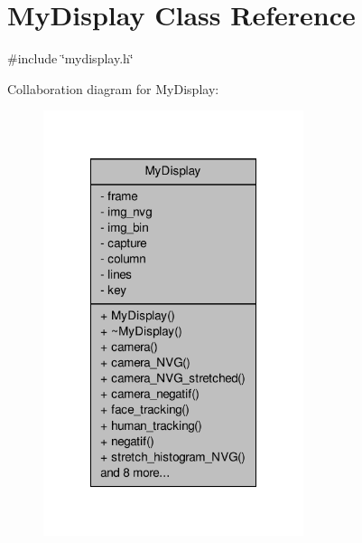 \hypertarget{classMyDisplay}{\section{My\-Display Class Reference}
\label{classMyDisplay}
}


{\ttfamily \#include \char`\"{}mydisplay.\-h\char`\"{}}



Collaboration diagram for My\-Display\-:\nopagebreak
\begin{figure}[H]
\begin{center}
\leavevmode
\includegraphics[width=216pt]{classMyDisplay__coll__graph}
\end{center}
\end{figure}
